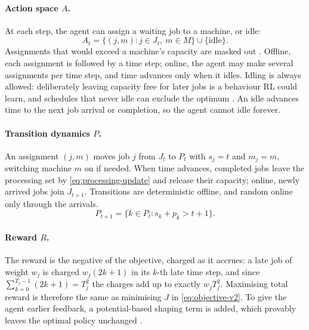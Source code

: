 \documentclass[12pt]{article}
\begin{document}
\paragraph{Action space $A$.} At each step, the agent can assign a waiting job to a machine, or idle:
\begin{equation}\label{eq:action-flat}
    A_t = \{(j, m) : j \in J_t,\ m \in M\} \cup \{\text{idle}\}.
\end{equation}
Assignments that would exceed a machine's capacity are masked out \cite{huang2020invalidmasking}. Offline, each assignment is followed by a time step; online, the agent may make several assignments per time step, and time advances only when it idles. Idling is always allowed: deliberately leaving capacity free for later jobs is a behaviour RL could learn, and schedules that never idle can exclude the optimum \cite{giffler1960active}. An idle advances time to the next job arrival or completion, so the agent cannot idle forever.

\paragraph{Transition dynamics $P$.} An assignment $(j, m)$ moves job $j$ from $J_t$ to $P_t$ with $s_j = t$ and $m_j = m$, switching machine $m$ on if needed. When time advances, completed jobs leave the processing set by \cref{eq:processing-update} and release their capacity; online, newly arrived jobs join $J_{t+1}$. Transitions are deterministic offline, and random online only through the arrivals.
\begin{equation}\label{eq:processing-update}
    P_{t+1} = \{k \in P_t : s_k + p_k > t + 1\}.
\end{equation}

\paragraph{Reward $R$.} The reward is the negative of the objective, charged as it accrues: a late job of weight $w_j$ is charged $w_j(2k+1)$ in its $k$-th late time step, and since $\sum_{k=0}^{T_j-1}(2k+1) = T_j^2$ the charges add up to exactly $w_j T_j^2$. Maximising total reward is therefore the same as minimising $J$ in \cref{eq:objective-v2}. To give the agent earlier feedback, a potential-based shaping term is added, which provably leaves the optimal policy unchanged \cite{ng1999shaping}.
\end{document}
